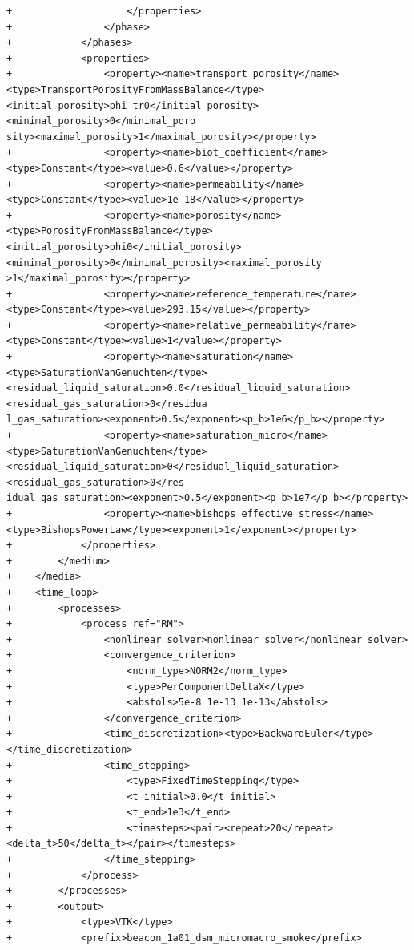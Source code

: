 \documentclass[10pt]{article}
\begin{document}
\begin{lstlisting}
+                    </properties>
+                </phase>
+            </phases>
+            <properties>
+                <property><name>transport_porosity</name><type>TransportPorosityFromMassBalance</type><initial_porosity>phi_tr0</initial_porosity><minimal_porosity>0</minimal_poro
sity><maximal_porosity>1</maximal_porosity></property>
+                <property><name>biot_coefficient</name><type>Constant</type><value>0.6</value></property>
+                <property><name>permeability</name><type>Constant</type><value>1e-18</value></property>
+                <property><name>porosity</name><type>PorosityFromMassBalance</type><initial_porosity>phi0</initial_porosity><minimal_porosity>0</minimal_porosity><maximal_porosity
>1</maximal_porosity></property>
+                <property><name>reference_temperature</name><type>Constant</type><value>293.15</value></property>
+                <property><name>relative_permeability</name><type>Constant</type><value>1</value></property>
+                <property><name>saturation</name><type>SaturationVanGenuchten</type><residual_liquid_saturation>0.0</residual_liquid_saturation><residual_gas_saturation>0</residua
l_gas_saturation><exponent>0.5</exponent><p_b>1e6</p_b></property>
+                <property><name>saturation_micro</name><type>SaturationVanGenuchten</type><residual_liquid_saturation>0</residual_liquid_saturation><residual_gas_saturation>0</res
idual_gas_saturation><exponent>0.5</exponent><p_b>1e7</p_b></property>
+                <property><name>bishops_effective_stress</name><type>BishopsPowerLaw</type><exponent>1</exponent></property>
+            </properties>
+        </medium>
+    </media>
+    <time_loop>
+        <processes>
+            <process ref="RM">
+                <nonlinear_solver>nonlinear_solver</nonlinear_solver>
+                <convergence_criterion>
+                    <norm_type>NORM2</norm_type>
+                    <type>PerComponentDeltaX</type>
+                    <abstols>5e-8 1e-13 1e-13</abstols>
+                </convergence_criterion>
+                <time_discretization><type>BackwardEuler</type></time_discretization>
+                <time_stepping>
+                    <type>FixedTimeStepping</type>
+                    <t_initial>0.0</t_initial>
+                    <t_end>1e3</t_end>
+                    <timesteps><pair><repeat>20</repeat><delta_t>50</delta_t></pair></timesteps>
+                </time_stepping>
+            </process>
+        </processes>
+        <output>
+            <type>VTK</type>
+            <prefix>beacon_1a01_dsm_micromacro_smoke</prefix>

\end{lstlisting}
\end{document}
